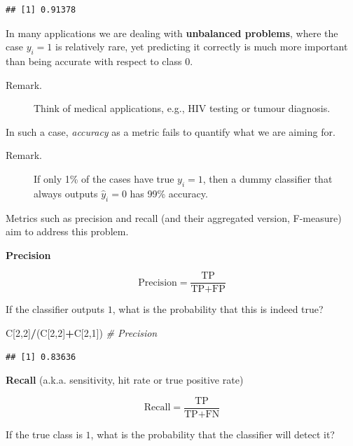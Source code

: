 \documentclass[10pt,b5paper,krantz1]{krantz}
\newenvironment{Shaded}{\begin{snugshade}}{\end{snugshade}}
\newcommand{\CommentTok}[1]{\textcolor[rgb]{0.37,0.37,0.37}{\textit{#1}}}
\newcommand{\DecValTok}[1]{\textcolor[rgb]{0.06,0.06,0.06}{#1}}
\newcommand{\NormalTok}[1]{#1}
\newcommand{\OperatorTok}[1]{\textcolor[rgb]{0.43,0.43,0.43}{\textbf{#1}}}
\begin{document}
\begin{verbatim}
## [1] 0.91378
\end{verbatim}

In many applications we are dealing with \textbf{unbalanced problems}, where
the case \(y_i=1\) is relatively rare,
yet predicting it correctly is much more important than being
accurate with respect to class \(0\).

\begin{description}
\item[Remark.]
Think of medical applications, e.g., HIV testing
or tumour diagnosis.
\end{description}

In such a case, \emph{accuracy} as a metric fails to quantify what we are aiming for.

\begin{description}
\item[Remark.]
If only 1\% of the cases have true \(y_i=1\),
then a dummy classifier that always
outputs \(\hat{y}_i=0\) has 99\% accuracy.
\end{description}

Metrics such as precision and recall (and their aggregated version, F-measure)
aim to address this problem.

\textbf{Precision}

\[
\text{Precision} = \frac{\text{TP}}{\text{TP}+\text{FP}}
\]

If the classifier outputs \(1\),
what is the probability that this is indeed true?

\begin{Shaded}
\begin{Highlighting}[]
\NormalTok{C[}\DecValTok{2}\NormalTok{,}\DecValTok{2}\NormalTok{]}\OperatorTok{/}\NormalTok{(C[}\DecValTok{2}\NormalTok{,}\DecValTok{2}\NormalTok{]}\OperatorTok{+}\NormalTok{C[}\DecValTok{2}\NormalTok{,}\DecValTok{1}\NormalTok{]) }\CommentTok{# Precision}
\end{Highlighting}
\end{Shaded}

\begin{verbatim}
## [1] 0.83636
\end{verbatim}

\textbf{Recall} (a.k.a. sensitivity, hit rate or true positive rate)

\[
\text{Recall} = \frac{\text{TP}}{\text{TP}+\text{FN}}
\]

If the true class is \(1\), what is the probability that the classifier
will detect it?
\end{document}
